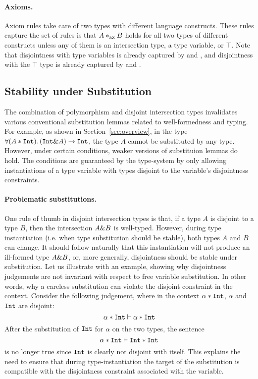 \paragraph{Axioms.} Axiom rules take care of two types with different language constructs.
These rules capture the set of rules is that $A *_\textnormal{ax} B$ holds for all 
two types of different constructs unless any of them is an intersection type, a type variable,
or $\top$.
Note that disjointness with type variables is already captured by  and 
, and disjointness with the $\top$ type is already captured by 
{} and {}.

\subsection{Stability under Substitution}
The combination of polymorphism and disjoint intersection types
invalidates various conventional substitution lemmas related to
well-formedness and typing.  
For example, as shown in Section~\ref{sec:overview}, in the type 
$\forall (A * \texttt{Int}).\, (\texttt{Int} \& A) \to \texttt{Int}$, the type $A$ cannot be substituted by any type.
However, under certain conditions, weaker versions of substituion lemmas do hold. 
The conditions are guaranteed by the type-system by only
allowing instantiations of a type variable with types disjoint to the
variable's disjointness constraints.

\paragraph{Problematic substitutions.}
One rule of thumb in disjoint intersection types is that, if a type
$A$ is disjoint to a type $B$, then the intersection $A \& B$ is
well-typed.  However, during type instantiation (i.e. when type
substitution should be stable), both types $A$ and $B$ can change.  It
should follow naturally that this instantiation will not produce an
ill-formed type $A \& B$, or, more generally, disjointness should
be stable under substitution.  Let us illustrate with an example,
showing why disjointness judgements are not invariant with respect to
free variable substitution.  In other words, why a careless
substitution can violate the disjoint constraint in the context.
Consider the following judgement, where in the context $\alpha
* \texttt{Int}$, $\alpha$ and $\texttt{Int}$ are disjoint:
\[ \alpha * \texttt{Int} \vdash \alpha * \texttt{Int} \]
After the substitution of $\texttt{Int}$ for $\alpha$ on the two types, the sentence
\[ \alpha * \texttt{Int} \vdash \texttt{Int} * \texttt{Int} \]
is no longer true since $\texttt{Int}$ is clearly not disjoint with itself.
This explains the need to ensure that during type-instantiation the target of the substitution  
is compatible with the disjointness constraint associated with the variable. 

